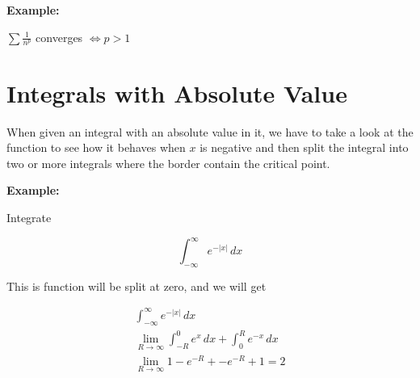\textbf{Example:}

\(\sum \frac{1}{n^p}\) converges \(\iff p > 1\)

\section{Integrals with Absolute Value}

When given an integral with an absolute value in it, we have to take a look at the function to see how it behaves when \(x\) is negative and then 
split the integral into two or more integrals where the border contain the critical point.

\textbf{Example:}

Integrate

\[
    \int_{-\infty}^{\infty}e^{-|x|}\,dx
\]

This is function will be split at zero, and we will get

\begin{align*} 
    \int_{-\infty}^{\infty}e^{-|x|}\,dx \\ 
    \lim_{R \to \infty} \int_{-R}^{0}e^{x}\,dx +  \int_{0}^{R}e^{-x}\,dx \\ 
    \lim_{R \to \infty}  1 - e^{-R} + - e^{-R} + 1  = 2
\end{align*}
